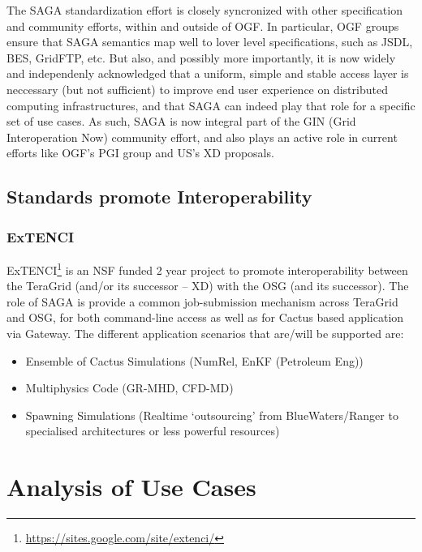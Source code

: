 \documentclass[10pt,conference,final,letterpaper,twoside,twocolumn,]{IEEEtran}
\begin{document}
  The SAGA standardization effort is closely syncronized with other
  specification and community efforts, within and outside of OGF.  In
  particular, OGF groups ensure that SAGA semantics map well to lover
  level specifications, such as JSDL, BES, GridFTP, etc.   But also, 
  and possibly more importantly, it is now widely and independenly
  acknowledged that a uniform, simple and stable access layer is
  neccessary (but not sufficient) to improve end user experience on
  distributed computing infrastructures, and that SAGA can indeed play
  that role for a specific set of use cases.  As such, SAGA is now
  integral part of the GIN (Grid Interoperation Now) community effort,
  and also plays an active role in current efforts like OGF's PGI
  group and US's XD proposals.
  


\subsection{Standards promote Interoperability}

 \subsubsection*{ExTENCI}

 ExTENCI\footnote{\url{https://sites.google.com/site/extenci/}} is an
 NSF funded 2 year project to promote interoperability between the
 TeraGrid (and/or its successor -- XD) with the OSG (and its
 successor).  The role of SAGA is provide a common job-submission
 mechanism across TeraGrid and OSG, for both command-line access as
 well as for Cactus based application via Gateway.  The different
 application scenarios that are/will be supported are:
 
 \begin{itemize}
 \item Ensemble of Cactus Simulations (NumRel, EnKF (Petroleum Eng))
 \item Multiphysics Code (GR-MHD, CFD-MD)
 \item Spawning Simulations (Realtime ‘outsourcing’ from
   BlueWaters/Ranger to specialised architectures or less powerful
   resources)
 \end{itemize}



\section{Analysis of Use Cases}
\end{document}
